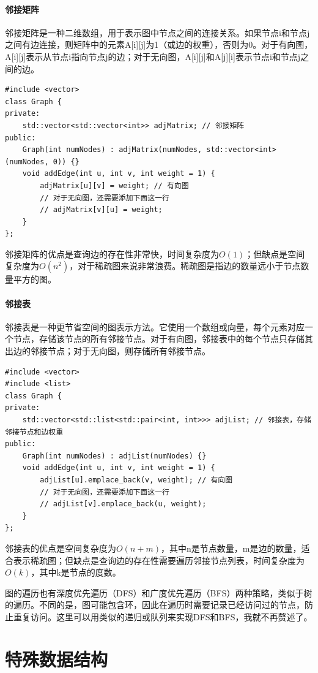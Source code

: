 \paragraph{邻接矩阵}
邻接矩阵是一种二维数组，用于表示图中节点之间的连接关系。如果节点i和节点j之间有边连接，则矩阵中的元素A[i][j]为1（或边的权重），否则为0。对于有向图，A[i][j]表示从节点i指向节点j的边；对于无向图，A[i][j]和A[j][i]表示节点i和节点j之间的边。
\begin{verbatim}
#include <vector>
class Graph {
private:
    std::vector<std::vector<int>> adjMatrix; // 邻接矩阵
public:
    Graph(int numNodes) : adjMatrix(numNodes, std::vector<int>(numNodes, 0)) {}
    void addEdge(int u, int v, int weight = 1) {
        adjMatrix[u][v] = weight; // 有向图
        // 对于无向图，还需要添加下面这一行
        // adjMatrix[v][u] = weight;
    }
};
\end{verbatim}
邻接矩阵的优点是查询边的存在性非常快，时间复杂度为$O(1)$；但缺点是空间复杂度为$O(n^2)$，对于稀疏图来说非常浪费。稀疏图是指边的数量远小于节点数量平方的图。

\paragraph{邻接表}
邻接表是一种更节省空间的图表示方法。它使用一个数组或向量，每个元素对应一个节点，存储该节点的所有邻接节点。对于有向图，邻接表中的每个节点只存储其出边的邻接节点；对于无向图，则存储所有邻接节点。
\begin{verbatim}
#include <vector>
#include <list>
class Graph {
private:
    std::vector<std::list<std::pair<int, int>>> adjList; // 邻接表，存储邻接节点和边权重
public:
    Graph(int numNodes) : adjList(numNodes) {}
    void addEdge(int u, int v, int weight = 1) {
        adjList[u].emplace_back(v, weight); // 有向图
        // 对于无向图，还需要添加下面这一行
        // adjList[v].emplace_back(u, weight);
    }
};
\end{verbatim}
邻接表的优点是空间复杂度为$O(n + m)$，其中n是节点数量，m是边的数量，适合表示稀疏图；但缺点是查询边的存在性需要遍历邻接节点列表，时间复杂度为$O(k)$，其中k是节点的度数。

图的遍历也有深度优先遍历（DFS）和广度优先遍历（BFS）两种策略，类似于树的遍历。不同的是，图可能包含环，因此在遍历时需要记录已经访问过的节点，防止重复访问。这里可以用类似的递归或队列来实现DFS和BFS，我就不再赘述了。

\section{特殊数据结构}

